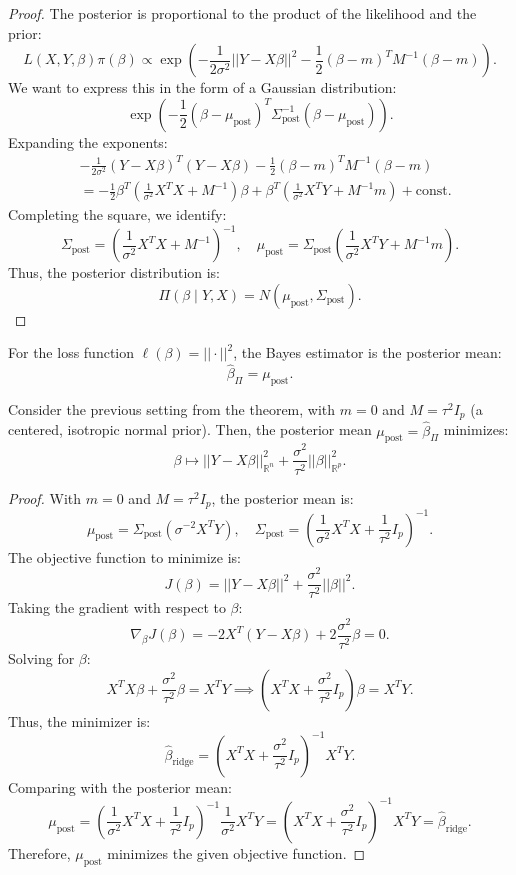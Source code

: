 \documentclass[open=any, 11pt,paper=A4]{scrreprt}
\begin{document}
\begin{proof}
The posterior is proportional to the product of the likelihood and the prior:
\[
L(X, Y, \beta) \pi(\beta) \propto \exp\left( -\frac{1}{2\sigma^2} ||Y - X\beta||^2 - \frac{1}{2} (\beta - m)^T M^{-1} (\beta - m) \right).
\]
We want to express this in the form of a Gaussian distribution:
\[
\exp\left( -\frac{1}{2} (\beta - \mu_{\text{post}})^T \Sigma_{\text{post}}^{-1} (\beta - \mu_{\text{post}}) \right).
\]
Expanding the exponents:
\begin{align*}
& -\frac{1}{2\sigma^2} (Y - X\beta)^T (Y - X\beta) - \frac{1}{2} (\beta - m)^T M^{-1} (\beta - m) \\
&= -\frac{1}{2} \beta^T \left( \frac{1}{\sigma^2} X^T X + M^{-1} \right) \beta + \beta^T \left( \frac{1}{\sigma^2} X^T Y + M^{-1} m \right) + \text{const}.
\end{align*}
Completing the square, we identify:
\[
\Sigma_{\text{post}} = \left( \frac{1}{\sigma^2} X^T X + M^{-1} \right)^{-1}, \quad \mu_{\text{post}} = \Sigma_{\text{post}} \left( \frac{1}{\sigma^2} X^T Y + M^{-1} m \right).
\]
Thus, the posterior distribution is:
\[
\Pi(\beta \mid Y, X) = N(\mu_{\text{post}}, \Sigma_{\text{post}}).
\]
\end{proof}

\begin{corollary}
For the loss function $\ell(\beta) = ||\cdot||^2$, the Bayes estimator is the posterior mean:
\[
\hat{\beta}_\Pi = \mu_{\text{post}}.
\]
\end{corollary}

\begin{proposition}
Consider the previous setting from the theorem, with $m = 0$ and $M = \tau^2 I_p$ (a centered, isotropic normal prior). Then, the posterior mean $\mu_{\text{post}} = \hat{\beta}_\Pi$ minimizes:
\[
\beta \mapsto ||Y - X\beta||^2_{\mathbb{R}^n} + \frac{\sigma^2}{\tau^2} ||\beta||^2_{\mathbb{R}^p}.
\]
\end{proposition}

\begin{proof}
With $m = 0$ and $M = \tau^2 I_p$, the posterior mean is:
\[
\mu_{\text{post}} = \Sigma_{\text{post}} \left( \sigma^{-2} X^T Y \right), \quad \Sigma_{\text{post}} = \left( \frac{1}{\sigma^2} X^T X + \frac{1}{\tau^2} I_p \right)^{-1}.
\]
The objective function to minimize is:
\[
J(\beta) = ||Y - X\beta||^2 + \frac{\sigma^2}{\tau^2} ||\beta||^2.
\]
Taking the gradient with respect to $\beta$:
\[
\nabla_\beta J(\beta) = -2X^T(Y - X\beta) + 2\frac{\sigma^2}{\tau^2} \beta = 0.
\]
Solving for $\beta$:
\[
X^T X \beta + \frac{\sigma^2}{\tau^2} \beta = X^T Y \implies \left( X^T X + \frac{\sigma^2}{\tau^2} I_p \right) \beta = X^T Y.
\]
Thus, the minimizer is:
\[
\hat{\beta}_{\text{ridge}} = \left( X^T X + \frac{\sigma^2}{\tau^2} I_p \right)^{-1} X^T Y.
\]
Comparing with the posterior mean:
\[
\mu_{\text{post}} = \left( \frac{1}{\sigma^2} X^T X + \frac{1}{\tau^2} I_p \right)^{-1} \frac{1}{\sigma^2} X^T Y = \left( X^T X + \frac{\sigma^2}{\tau^2} I_p \right)^{-1} X^T Y = \hat{\beta}_{\text{ridge}}.
\]
Therefore, $\mu_{\text{post}}$ minimizes the given objective function.
\end{proof}
\end{document}
